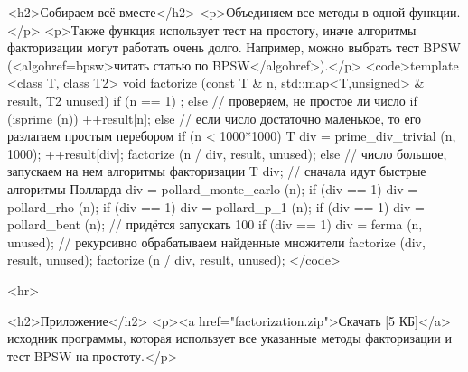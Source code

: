 <h2>Собираем всё вместе</h2>
<p>Объединяем все методы в одной функции.</p>
<p>Также функция использует тест на простоту, иначе алгоритмы факторизации могут работать очень долго. Например, можно выбрать тест BPSW (<algohref=bpsw>читать статью по BPSW</algohref>).</p>
<code>template <class T, class T2>
void factorize (const T & n, std::map<T,unsigned> & result, T2 unused)
{
	if (n == 1)
		;
	else
		// проверяем, не простое ли число
		if (isprime (n))
			++result[n];
		else
			// если число достаточно маленькое, то его разлагаем простым перебором
			if (n < 1000*1000)
			{
				T div = prime_div_trivial (n, 1000);
				++result[div];
				factorize (n / div, result, unused);
			}
			else
			{
				// число большое, запускаем на нем алгоритмы факторизации
				T div;
				// сначала идут быстрые алгоритмы Полларда
				div = pollard_monte_carlo (n);
				if (div == 1)
					div = pollard_rho (n);
				if (div == 1)
					div = pollard_p_1 (n);
				if (div == 1)
					div = pollard_bent (n);
				// придётся запускать 100%
				if (div == 1)
					div = ferma (n, unused);
				// рекурсивно обрабатываем найденные множители
				factorize (div, result, unused);
				factorize (n / div, result, unused);
			}
}</code>

<hr>

<h2>Приложение</h2>
<p><a href="factorization.zip">Скачать [5 КБ]</a> исходник программы, которая использует все указанные методы факторизации и тест BPSW на простоту.</p>